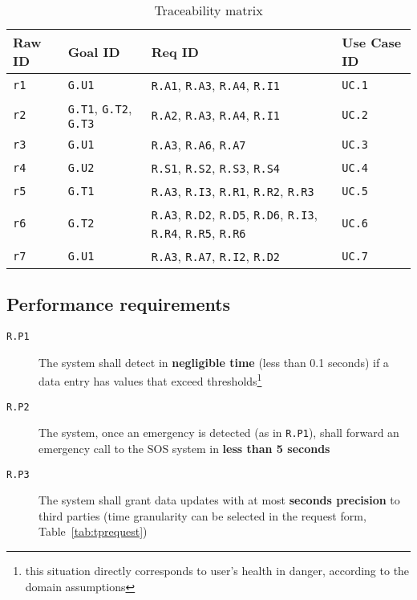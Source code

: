     \begin{table}[h!]
      \centering
      \begin{tabularx}{.8\linewidth}{|X|X|X|X|}
        \hline
        \textbf{Raw ID} & \textbf{Goal ID} & \textbf{Req ID} & \textbf{Use Case ID} \\ \hline
        \texttt{r1} & \texttt{G.U1} & \texttt{R.A1}, \texttt{R.A3}, \texttt{R.A4}, \texttt{R.I1} & \texttt{UC.1} \\
        \hline
        \texttt{r2} & \texttt{G.T1}, \texttt{G.T2}, \texttt{G.T3} & \texttt{R.A2}, \texttt{R.A3}, \texttt{R.A4}, \texttt{R.I1} & \texttt{UC.2} \\
        \hline
        \texttt{r3} & \texttt{G.U1} & \texttt{R.A3}, \texttt{R.A6}, \texttt{R.A7} & \texttt{UC.3} \\
        \hline
        \texttt{r4} & \texttt{G.U2} & \texttt{R.S1},  \texttt{R.S2}, \texttt{R.S3}, \texttt{R.S4} & \texttt{UC.4} \\
        \hline
        \texttt{r5} & \texttt{G.T1} & \texttt{R.A3}, \texttt{R.I3}, \texttt{R.R1}, \texttt{R.R2}, \texttt{R.R3}& \texttt{UC.5}  \\
        \hline
        \texttt{r6} & \texttt{G.T2} & \texttt{R.A3},  \texttt{R.D2}, \texttt{R.D5}, \texttt{R.D6}, \texttt{R.I3}, \texttt{R.R4}, \texttt{R.R5}, \texttt{R.R6} & \texttt{UC.6}   \\
        \hline
        \texttt{r7} & \texttt{G.U1} & \texttt{R.A3}, \texttt{R.A7},  \texttt{R.I2},  \texttt{R.D2} & \texttt{UC.7}   \\
        \hline
      \end{tabularx}
      \caption{Traceability matrix}
      \label{tab:tracmatrix}
    \end{table}

  \clearpage
  \subsection{Performance requirements}
  \label{sec:performance}

    \begin{description}
      \item[\texttt{R.P1}] The system shall detect in \textbf{negligible time} (less than 0.1 seconds) if a data entry has values that exceed thresholds\footnote{this situation directly corresponds to user's health in danger, according to the domain assumptions}
      \item[\texttt{R.P2}] The system, once an emergency is detected (as in \texttt{R.P1}), shall forward an emergency call to the SOS system in \textbf{less than 5 seconds}
      \item[\texttt{R.P3}] The system shall grant data updates with at most \textbf{seconds precision} to third parties (time granularity can be selected in the request form, Table~\ref{tab:tprequest})
    \end{description}

